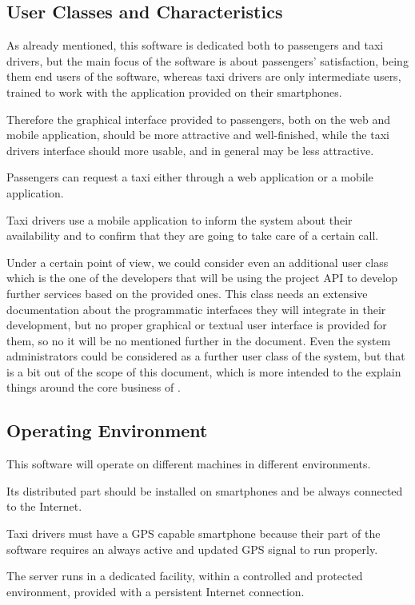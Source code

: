\subsection{User Classes and Characteristics}
As already mentioned, this software is dedicated both to passengers and taxi drivers, but the main focus of the software is about passengers' satisfaction, being them end users of the software, whereas taxi drivers are only intermediate users, trained to work with the application provided on their smartphones.\par
Therefore the graphical interface provided to passengers, both on the web and mobile application, should be more attractive and well-finished, while the taxi drivers interface should more usable, and in general may be less attractive.\par
Passengers can request a taxi either through a web application or a mobile application.\par
Taxi drivers use a mobile application to inform the system about their availability and to confirm that they are going to take care of a certain call.\par
Under a certain point of view, we could consider even an additional user class which is the one of the developers that will be using the project API to develop further services based on the provided ones.
This class needs an extensive documentation about the programmatic interfaces they will integrate in their development, but no proper graphical or textual user interface is provided for them, so no it will be no mentioned further in the document.
Even the system administrators could be considered as a further user class of the system, but that is a bit out of the scope of this document, which is more intended to the explain things around the core business of \myTaxiService{}.
\subsection{Operating Environment}
This software will operate on different machines in different environments.\par
Its distributed part should be installed on smartphones and be always connected to the Internet.\par
Taxi drivers must have a GPS capable smartphone because their part of the software requires an always active and updated GPS signal to run properly.\par
The server runs in a dedicated facility, within a controlled and protected environment, provided with a persistent Internet connection.
